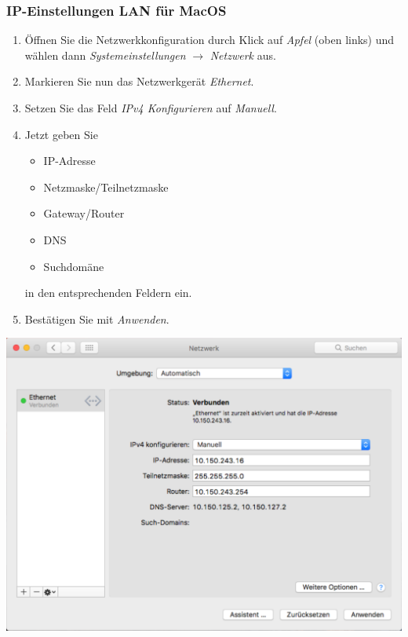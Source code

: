 \documentclass[a4paper,12pt]{scrartcl}
\begin{document}
\subsubsection*{IP-Einstellungen LAN für MacOS}

\begin{minipage}{0.57\textwidth}
\begin{enumerate}
    \item Öffnen Sie die Netzwerkkonfiguration durch Klick auf \emph{Apfel} (oben links) und wählen dann \emph{Systemeinstellungen} $\rightarrow$ \emph{Netzwerk} aus.
    \item Markieren Sie nun das Netzwerkgerät \emph{Ethernet}.
    \item Setzen Sie das Feld \emph{IPv4 Konfigurieren} auf \emph{Manuell}.
    \item Jetzt geben Sie
    \begin{itemize}
    	\item IP-Adresse
    	\item Netzmaske/Teilnetzmaske
    	\item Gateway/Router
    	\item DNS
    	\item Suchdomäne
    \end{itemize}
	in den entsprechenden Feldern ein.
	\item Bestätigen Sie mit \emph{Anwenden}.
\end{enumerate}
\end{minipage}
\hfill
\begin{minipage}{0.4\textwidth}
	\centering
	\includegraphics[width=\linewidth,keepaspectratio]{Bilder/IP_MAC}
\end{minipage}
\end{document}

